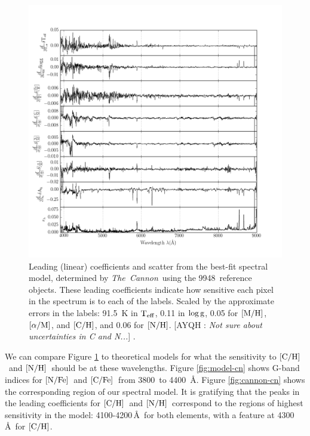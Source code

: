 \documentclass[12pt, preprint]{aastex}
\newcommand{\tc}{\textsl{The~Cannon}}
\newcommand{\teff}{\mbox{$\rm T_{eff}$}}
\newcommand{\logg}{\mbox{$\rm \log g$}}
\newcommand{\mh}{\mbox{$\rm [M/H]$}}
\newcommand{\alpham}{\mbox{$\rm [\alpha/M]$}}
\newcommand{\carbon}{\mbox{$\rm [C/H]$}}
\newcommand{\cfe}{\mbox{$\rm [C/Fe]$}}
\newcommand{\nitrogen}{\mbox{$\rm [N/H]$}}
\newcommand{\nfe}{\mbox{$\rm [N/Fe]$}}
\newcommand{\angstrom}{\mbox{\AA}}
\newcommand{\ntrobj}{9948}
\newcommand{\Comment}[2]{ [{\color{red}\sc #1 :} {{\color{cyan} \it #2}}]}
\begin{document}
\begin{figure}[!p]
\centering
\includegraphics[scale=0.7]{leading_coeffs.png}
\caption{Leading (linear) coefficients and scatter 
  from the best-fit spectral model, 
determined by \tc\ using the \ntrobj\ reference objects. 
These leading coefficients indicate how sensitive each pixel 
in the spectrum is to each of the labels. 
Scaled by the approximate errors in the labels:
91.5~K in \teff, 0.11 in \logg, 0.05 for \mh, \alpham, and \carbon, 
and 0.06 for \nitrogen. 
\Comment{AYQH}{Not sure about uncertainties in C and N...}
\citep{Holtzman2015}.}
\label{fig:leading-coeffs}
\end{figure}

We can compare Figure \ref{fig:leading-coeffs} to 
theoretical models for what the sensitivity to
\carbon\ and \nitrogen\ should be
at these wavelengths. Figure \ref{fig:model-cn}
shows G-band indices for \nfe\ and \cfe\ from
3800\, to 4400\, \angstrom. Figure \ref{fig:cannon-cn}
shows the corresponding region of our spectral model.
It is gratifying that the peaks in the leading coefficients
for \carbon\ and \nitrogen\ correspond to the regions
of highest sensitivity in the model: 4100-4200\,\angstrom\ 
for both elements, with a feature at 4300\,\angstrom\ for 
\carbon. 
\end{document}

